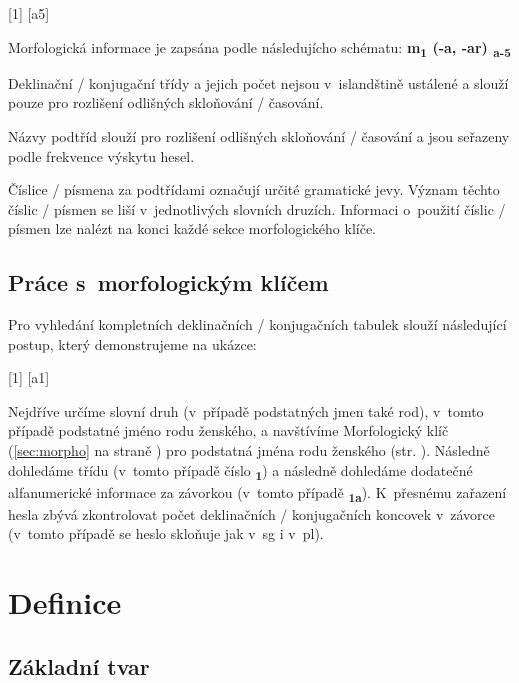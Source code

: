 \blspace
  \dicEntry {} [1] [a5]
\blspace

Morfologická informace je zapsána podle následujícho schématu: \textbf{m{\textsubscript{1}} (-a, -ar) {\textsubscript{a-5}} }

\tableB

Deklinační / konjugační třídy a jejich počet nejsou v~islandštině ustálené a slouží pouze pro rozlišení odlišných skloňování / časování.

Názvy podtříd slouží pro rozlišení odlišných skloňování / časování a jsou seřazeny podle frekvence výskytu hesel.

Číslice / písmena za podtřídami označují určité gramatické jevy. Význam těchto číslic / písmen se liší v~jednotlivých slovních druzích. Informaci o~použití číslic / písmen lze nalézt na konci každé sekce morfologického klíče.

\subsection*{Práce s~morfologickým klíčem}

Pro vyhledání kompletních deklinačních / konjugačních tabulek slouží následující postup, který demonstrujeme na ukázce:

\blspace
  \dicEntry {} [1] [a1]
\blspace

Nejdříve určíme slovní druh (v~případě podstatných jmen také rod), v~tomto případě podstatné jméno rodu ženského, a navštívíme Morfologický klíč (\ref{sec:morpho} na straně \pageref{sec:morpho}) pro podstatná jména rodu ženského (str. \pageref{sec:morpho_f}).
Následně dohledáme třídu (v~tomto případě číslo {\textsubscript{\textbf{1}}}) a následně dohledáme dodatečné alfanumerické informace za závorkou (v~tomto případě {\textsubscript{\textbf{1a}}}).
K~přesnému zařazení hesla zbývá zkontrolovat počet deklinačních / konjugačních koncovek v~závorce (v~tomto případě se heslo skloňuje jak v~sg i v~pl).

\tableC

\section{Definice}

\subsection*{Základní tvar}

